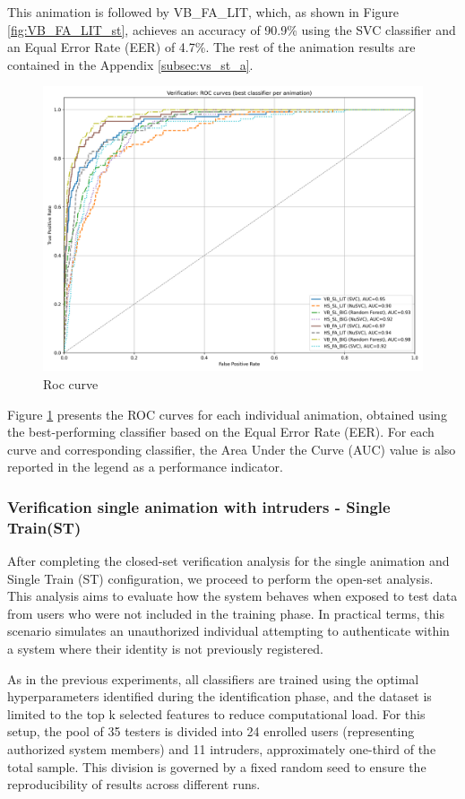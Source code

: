 \documentclass{article}
\begin{document}
This animation is followed by VB\_FA\_LIT, which, as shown in Figure \ref{fig:VB_FA_LIT_st}, achieves an accuracy of 90.9\% using the SVC classifier and an Equal Error Rate (EER) of 4.7\%.
The rest of the animation results are contained in the Appendix \ref{subsec:vs_st_a}.

\begin{figure}[ht]
    \centering
    \includegraphics[width = 0.6
    \textwidth]{Images/Results/Verification_single/st/best_animation_roc_curves_st.png}
    \caption{Roc curve}
    \label{fig:roc_st}
\end{figure}

Figure \ref{fig:roc_st} presents the ROC curves for each individual animation, obtained using the best-performing classifier based on the Equal Error Rate (EER).
For each curve and corresponding classifier, the Area Under the Curve (AUC) value is also reported in the legend as a performance indicator.
\FloatBarrier

\subsubsection{Verification single animation with intruders - Single Train(ST)}
\label{subsec:vsi}

After completing the closed-set verification analysis for the single animation and Single Train (ST) configuration, we proceed to perform the open-set analysis.
This analysis aims to evaluate how the system behaves when exposed to test data from users who were not included in the training phase.
In practical terms, this scenario simulates an unauthorized individual attempting to authenticate within a system where their identity is not previously registered.

As in the previous experiments, all classifiers are trained using the optimal hyperparameters identified during the identification phase, and the dataset is limited to the top k selected features to reduce computational load.
For this setup, the pool of 35 testers is divided into 24 enrolled users (representing authorized system members) and 11 intruders, approximately one-third of the total sample.
This division is governed by a fixed random seed to ensure the reproducibility of results across different runs.
\end{document}
